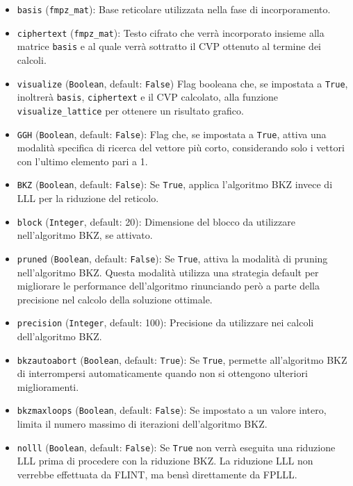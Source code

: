\begin{itemize}
    \item \texttt{basis} (\texttt{fmpz\_mat}):
    Base reticolare utilizzata nella fase di incorporamento.
    \item \texttt{ciphertext} (\texttt{fmpz\_mat}):
    Testo cifrato che verrà incorporato insieme alla matrice \texttt{basis} e al quale
    verrà sottratto il CVP ottenuto al termine dei calcoli.
    \item \texttt{visualize} (\texttt{Boolean}, default: \texttt{False})
    Flag booleana che, se impostata a \texttt{True}, inoltrerà \texttt{basis}, \texttt{ciphertext} e
    il CVP calcolato, alla funzione \texttt{visualize\_lattice} per ottenere un risultato
    grafico.
    \item \texttt{GGH} (\texttt{Boolean}, default: \texttt{False}):
    Flag che, se impostata a \texttt{True}, attiva una modalità specifica di ricerca del vettore più corto,
    considerando solo i vettori con l'ultimo elemento pari a 1.
    \item \texttt{BKZ} (\texttt{Boolean}, default: \texttt{False}):
    Se \texttt{True}, applica l'algoritmo BKZ invece di LLL per la riduzione del reticolo.
    \item \texttt{block} (\texttt{Integer}, default: 20):
    Dimensione del blocco da utilizzare nell'algoritmo BKZ, se attivato.
    \item \texttt{pruned} (\texttt{Boolean}, default: \texttt{False}):
    Se \texttt{True}, attiva la modalità di pruning nell'algoritmo BKZ. Questa modalità utilizza
    una strategia default per migliorare le performance dell'algoritmo 
    rinunciando però a parte della precisione nel calcolo della soluzione ottimale. 
    \item \texttt{precision} (\texttt{Integer}, default: 100):
    Precisione da utilizzare nei calcoli dell'algoritmo BKZ.
    \item \texttt{bkzautoabort} (\texttt{Boolean}, default: \texttt{True}):
    Se \texttt{True}, permette all'algoritmo BKZ di interrompersi automaticamente quando non si ottengono ulteriori miglioramenti.
    \item \texttt{bkzmaxloops} (\texttt{Boolean}, default: \texttt{False}):
    Se impostato a un valore intero, limita il numero massimo di iterazioni dell'algoritmo BKZ.
    \item \texttt{nolll} (\texttt{Boolean}, default: \texttt{False}): 
    Se \texttt{True} non verrà eseguita una riduzione LLL prima di procedere con la riduzione BKZ.
    La riduzione LLL non verrebbe effettuata da FLINT, ma bensì direttamente da FPLLL. 
\end{itemize}

